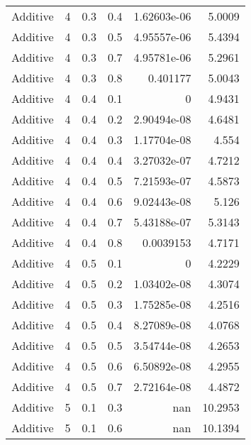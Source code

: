 \documentclass{article}
\begin{document}
\begin{longtable}[H]{lrrrrr}
 Additive       &       4 &   0.3 &            0.4 &   1.62603e-06 &          5.0009 \\
 Additive       &       4 &   0.3 &            0.5 &   4.95557e-06 &          5.4394 \\
 Additive       &       4 &   0.3 &            0.7 &   4.95781e-06 &          5.2961 \\
 Additive       &       4 &   0.3 &            0.8 &   0.401177    &          5.0043 \\
 Additive       &       4 &   0.4 &            0.1 &   0           &          4.9431 \\
 Additive       &       4 &   0.4 &            0.2 &   2.90494e-08 &          4.6481 \\
 Additive       &       4 &   0.4 &            0.3 &   1.17704e-08 &          4.554  \\
 Additive       &       4 &   0.4 &            0.4 &   3.27032e-07 &          4.7212 \\
 Additive       &       4 &   0.4 &            0.5 &   7.21593e-07 &          4.5873 \\
 Additive       &       4 &   0.4 &            0.6 &   9.02443e-08 &          5.126  \\
 Additive       &       4 &   0.4 &            0.7 &   5.43188e-07 &          5.3143 \\
 Additive       &       4 &   0.4 &            0.8 &   0.0039153   &          4.7171 \\
 Additive       &       4 &   0.5 &            0.1 &   0           &          4.2229 \\
 Additive       &       4 &   0.5 &            0.2 &   1.03402e-08 &          4.3074 \\
 Additive       &       4 &   0.5 &            0.3 &   1.75285e-08 &          4.2516 \\
 Additive       &       4 &   0.5 &            0.4 &   8.27089e-08 &          4.0768 \\
 Additive       &       4 &   0.5 &            0.5 &   3.54744e-08 &          4.2653 \\
 Additive       &       4 &   0.5 &            0.6 &   6.50892e-08 &          4.2955 \\
 Additive       &       4 &   0.5 &            0.7 &   2.72164e-08 &          4.4872 \\
 Additive       &       5 &   0.1 &            0.3 & nan           &         10.2953 \\
 Additive       &       5 &   0.1 &            0.6 & nan           &         10.1394 \\

\end{longtable}
\end{document}
